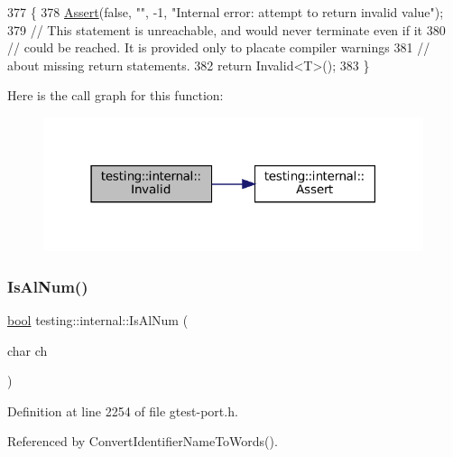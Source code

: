 \begin{DoxyCode}
377                    \{
378   \hyperlink{namespacetesting_1_1internal_a7a259643b7f2d23ce2b757728df42c99}{Assert}(\textcolor{keyword}{false}, \textcolor{stringliteral}{""}, -1, \textcolor{stringliteral}{"Internal error: attempt to return invalid value"});
379   \textcolor{comment}{// This statement is unreachable, and would never terminate even if it}
380   \textcolor{comment}{// could be reached. It is provided only to placate compiler warnings}
381   \textcolor{comment}{// about missing return statements.}
382   \textcolor{keywordflow}{return} Invalid<T>();
383 \}
\end{DoxyCode}
Here is the call graph for this function\+:
\nopagebreak
\begin{figure}[H]
\begin{center}
\leavevmode
\includegraphics[width=316pt]{namespacetesting_1_1internal_a3316c24e8a79f5def3e85d763ae50854_cgraph}
\end{center}
\end{figure}
\mbox{\label{namespacetesting_1_1internal_a83802e7f23324cd512232203662e1a98}} 
\subsubsection{\texorpdfstring{Is\+Al\+Num()}{IsAlNum()}}
{\footnotesize\ttfamily \hyperlink{classbool}{bool} testing\+::internal\+::\+Is\+Al\+Num (\begin{DoxyParamCaption}\item[{char}]{ch }\end{DoxyParamCaption})\hspace{0.3cm}{\ttfamily [inline]}}



Definition at line 2254 of file gtest-\/port.\+h.



Referenced by Convert\+Identifier\+Name\+To\+Words().


